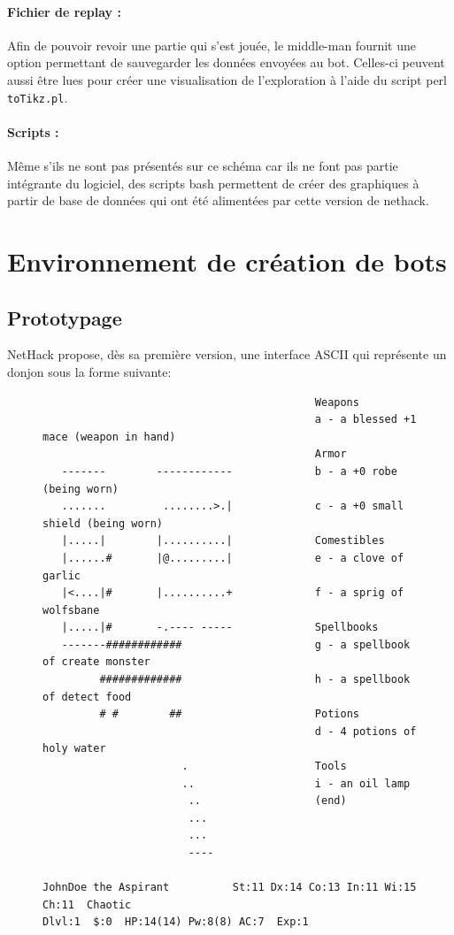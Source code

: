 \documentclass[a4paper,12pt]{article}
\begin{document}
\paragraph{Fichier de replay :}
Afin de pouvoir revoir une partie qui s'est jouée, le middle-man fournit une
option permettant de sauvegarder les données envoyées au bot. Celles-ci peuvent
aussi être lues pour créer une visualisation de l'exploration à l'aide du script
perl {\verb|toTikz.pl|}.%

\paragraph{Scripts :}
Même s'ils ne sont pas présentés sur ce schéma car ils ne font pas partie
intégrante du logiciel, des scripts bash permettent de créer des graphiques à
partir de base de données qui ont été alimentées par cette version de nethack.


\section{Environnement de création de bots}

\subsection{Prototypage}

NetHack propose, dès sa première version, une interface ASCII qui représente
un donjon sous la forme suivante:

\begin{figure}[H]
\begin{verbatim}
                                           Weapons
                                           a - a blessed +1 mace (weapon in hand)
                                           Armor
   -------        ------------             b - a +0 robe (being worn)
   .......         ........>.|             c - a +0 small shield (being worn)
   |.....|        |..........|             Comestibles
   |......#       |@.........|             e - a clove of garlic
   |<....|#       |..........+             f - a sprig of wolfsbane
   |.....|#       -.---- -----             Spellbooks
   -------############                     g - a spellbook of create monster
         #############                     h - a spellbook of detect food
         # #        ##                     Potions
                                           d - 4 potions of holy water
                      .                    Tools
                      ..                   i - an oil lamp
                       ..                  (end) 
                       ...
                       ...
                       ----

JohnDoe the Aspirant          St:11 Dx:14 Co:13 In:11 Wi:15 Ch:11  Chaotic
Dlvl:1  $:0  HP:14(14) Pw:8(8) AC:7  Exp:1
\end{verbatim}
\end{figure}
\end{document}
